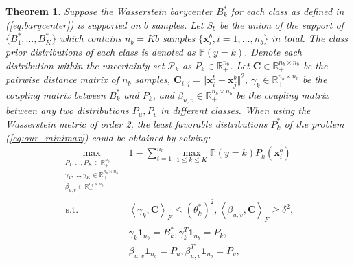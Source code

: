 \documentclass[journal]{IEEEtran}
\newtheorem{theorem}{Theorem}%
\begin{document}
\begin{theorem}%
\label{theorem:add_wass_all}
Suppose the Wasserstein barycenter $B_k^\ast$ for each class as defined in (\ref{eq:barycenter}) is supported on $b$ samples. 
Let $S_b$ be the union of the support of $\{B_1^\ast,\ldots,B_K^\ast\}$ which contains ${n_b}=Kb$ samples $\{\boldsymbol{x}_i^b, i=1,\ldots,n_b\}$ in total. 
The class prior distributions of each class is denoted as $\mathbb{P}(y=k)$.
Denote each distribution within the uncertainty set $\mathcal{P}_k$ as $P_k\in\mathbb{R}_+^{n_b}$.
Let $\boldsymbol{C}\in \mathbb{R}_+^{{n_b}\times {n_b}}$ be the pairwise distance matrix of $n_b$ samples, $\boldsymbol{C}_{i,j} = \Vert \boldsymbol{x}_i^b - \boldsymbol{x}_j^b\Vert^2$, $\gamma_k\in\mathbb{R}_+^{{n_b}\times {n_b}}$ be the coupling matrix between $B_k^*$ and $P_k$, 
and $\beta_{u,v}\in\mathbb{R}_+^{{n_b}\times {n_b}}$ be the coupling matrix between any two distributions $P_u, P_v$ in different classes.
When using the Wasserstein metric of order 2, the least favorable distributions $P^*_k$ of the problem (\ref{eq:our_minimax}) could be obtained by solving: 
\begin{equation}
\label{eq:add_wass_all}
\begin{aligned}
\max_{\substack{P_1,\ldots,P_{K}\in\mathbb{R}_+^{{n_b}}\\\gamma_1,\ldots,\gamma_{K}\in\mathbb{R}_+^{{n_b}\times {n_b}}\\ \beta_{u,v}\in\mathbb{R}_+^{{n_b}\times {n_b}}}}
  & 1-\sum_{i=1}^{{n_b}}\max_{1\leq k \leq K}\mathbb{P}(y=k) P_k\left(\boldsymbol{x}^b_i\right)\\
  \text { s.t. } 
  & \left\langle{\gamma}_k,\boldsymbol{C}\right\rangle_F\leq (\theta_k^*)^2,\left\langle{\beta}_{u,v},\boldsymbol{C}\right\rangle_F\geq \delta^2,\\
  & {\gamma}_k \boldsymbol{1}_{{n_b}}=B_k^*,{\gamma}_k^T \boldsymbol{1}_{{n_b}}=P_k,\\
  & {\beta}_{u,v} \boldsymbol{1}_{{n_b}}=P_u,{\beta}_{u,v}^T \boldsymbol{1}_{{n_b}}=P_v,\\

\end{aligned}
\end{equation}
\end{theorem}
\end{document}
